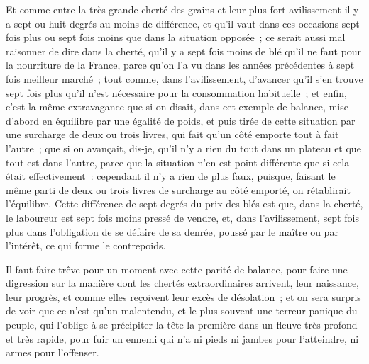\documentclass[french,twoside]{book} %
\begin{document}
Et comme entre la très grande cherté des grains et leur plus fort avilissement il y a sept ou huit degrés au moins de différence, et qu’il vaut dans ces occasions sept fois plus ou sept fois moins que dans la situation opposée ; ce serait aussi mal raisonner de dire dans la cherté, qu’il y a sept fois moins de blé qu’il ne faut pour la nourriture de la France, parce qu’on l’a vu dans les années précédentes à sept fois meilleur marché ; tout comme, dans l’avilissement, d’avancer qu’il s’en trouve sept fois plus qu’il n’est nécessaire pour la consommation habituelle ; et enfin, c’est la même extravagance que si on disait, dans cet exemple de balance, mise d’abord en équilibre par une égalité de poids, et puis tirée de cette situation par une surcharge de deux ou trois livres, qui fait qu’un côté emporte tout à fait l’autre ; que si on avançait, dis-je, qu’il n’y a rien du tout dans un plateau et que tout est dans l’autre, parce que la situation n’en est point différente que si cela était effectivement : cependant il n’y a rien de plus faux, puisque, faisant le même parti de deux ou trois livres de surcharge au côté emporté, on rétablirait l’équilibre. Cette différence de sept degrés du prix des blés est que, dans la cherté, le laboureur est sept fois moins pressé de vendre, et, dans l’avilissement, sept fois plus dans l’obligation de se défaire de sa denrée, poussé par le maître ou par l’intérêt, ce qui forme le contrepoids.\par
Il faut faire trêve pour un moment avec cette parité de balance, pour faire une digression sur la manière dont les chertés extraordinaires arrivent, leur naissance, leur progrès, et comme elles reçoivent leur excès de désolation ; et on sera surpris de voir que ce n’est qu’un malentendu, et le plus souvent une terreur panique du peuple, qui l’oblige à se précipiter la tête la première dans un fleuve très profond et très rapide, pour fuir un ennemi qui n’a ni pieds ni jambes pour l’atteindre, ni armes pour l’offenser.\par
\end{document}
